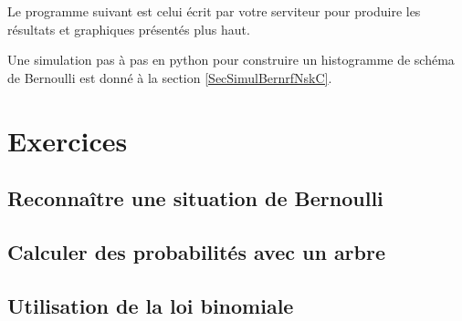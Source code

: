 Le programme suivant est celui écrit par votre serviteur pour produire les résultats et graphiques présentés plus haut.


Une simulation pas à pas en python pour construire un histogramme de schéma de Bernoulli est donné à la section \ref{SecSimulBernrfNskC}.

\section{Exercices }

\subsection{Reconnaître une situation de Bernoulli}


\subsection{Calculer des probabilités avec un arbre}


\subsection{Utilisation de la loi binomiale}

